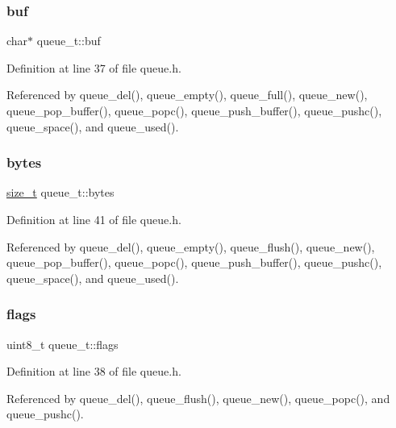 \subsubsection{\texorpdfstring{buf}{buf}}
{\footnotesize\ttfamily char$\ast$ queue\+\_\+t\+::buf}



Definition at line 37 of file queue.\+h.



Referenced by queue\+\_\+del(), queue\+\_\+empty(), queue\+\_\+full(), queue\+\_\+new(), queue\+\_\+pop\+\_\+buffer(), queue\+\_\+popc(), queue\+\_\+push\+\_\+buffer(), queue\+\_\+pushc(), queue\+\_\+space(), and queue\+\_\+used().

\mbox{\label{structqueue__t_a58398d4ee60bc90ffba2bc3488fe185b}} 
\subsubsection{\texorpdfstring{bytes}{bytes}}
{\footnotesize\ttfamily \hyperlink{hardware_2user__config_8h_aea0c7eab1ce1eebb4e879ef4e23c16ee}{size\+\_\+t} queue\+\_\+t\+::bytes}



Definition at line 41 of file queue.\+h.



Referenced by queue\+\_\+del(), queue\+\_\+empty(), queue\+\_\+flush(), queue\+\_\+new(), queue\+\_\+pop\+\_\+buffer(), queue\+\_\+popc(), queue\+\_\+push\+\_\+buffer(), queue\+\_\+pushc(), queue\+\_\+space(), and queue\+\_\+used().

\mbox{\label{structqueue__t_a2a516773a572c746d461c9df3cb30387}} 
\subsubsection{\texorpdfstring{flags}{flags}}
{\footnotesize\ttfamily uint8\+\_\+t queue\+\_\+t\+::flags}



Definition at line 38 of file queue.\+h.



Referenced by queue\+\_\+del(), queue\+\_\+flush(), queue\+\_\+new(), queue\+\_\+popc(), and queue\+\_\+pushc().

